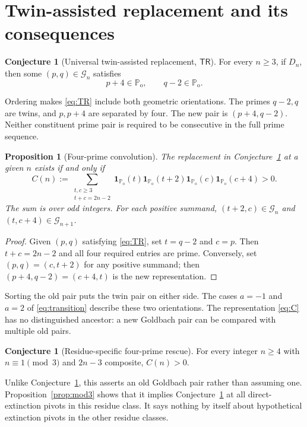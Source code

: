 \documentclass[11pt,a4paper]{article}
\newtheorem{proposition}[theorem]{Proposition}
\theoremstyle{definition}
\newtheorem{conjecture}[theorem]{Conjecture}
\theoremstyle{remark}
\newcommand{\Po}{\mathbb P_{\mathrm{o}}}
\newcommand{\G}{\mathcal G}
\newcommand{\TR}{\mathsf{TR}}
\newcommand{\ind}{\mathbf 1}
\begin{document}
\section{Twin-assisted replacement and its consequences}
\begin{conjecture}[Universal twin-assisted replacement, $\TR$]\label{conj:TR}
For every $n\ge3$, if $D_n$, then some $(p,q)\in\G_n$ satisfies
\begin{equation}\label{eq:TR}
 p+4\in\Po,\qquad q-2\in\Po.
\end{equation}
\end{conjecture}
Ordering makes \eqref{eq:TR} include both geometric orientations. The primes $q-2,q$ are twins, and $p,p+4$ are separated by four. The new pair is $(p+4,q-2)$. Neither constituent prime pair is required to be consecutive in the full prime sequence.

\begin{proposition}[Four-prime convolution]\label{prop:four}
The replacement in Conjecture~\ref{conj:TR} at a given $n$ exists if and only if
\begin{equation}\label{eq:C}
 C(n):=\sum_{\substack{t,c\ge3\\t+c=2n-2}}
 \ind_{\Po}(t)\ind_{\Po}(t+2)\ind_{\Po}(c)\ind_{\Po}(c+4)>0.
\end{equation}
The sum is over odd integers. For each positive summand, $(t+2,c)\in\G_n$
and $(t,c+4)\in\G_{n+1}$.
\end{proposition}
\begin{proof}
Given $(p,q)$ satisfying \eqref{eq:TR}, set $t=q-2$ and $c=p$.
Then $t+c=2n-2$ and all four required entries are prime.
Conversely, set $(p,q)=(c,t+2)$ for any positive summand;
then $(p+4,q-2)=(c+4,t)$ is the new representation.
\end{proof}
Sorting the old pair puts the twin pair on either side. The cases
$a=-1$ and $a=2$ of \eqref{eq:transition} describe these two orientations.
The representation \eqref{eq:C} has no distinguished ancestor:
a new Goldbach pair can be compared with multiple old pairs.

\begin{conjecture}[Residue-specific four-prime rescue]\label{conj:strong}
For every integer $n\ge4$ with $n\equiv1\pmod3$ and $2n-3$ composite,
$C(n)>0$.
\end{conjecture}
Unlike Conjecture~\ref{conj:TR}, this asserts an old Goldbach pair rather
than assuming one. Proposition~\ref{prop:mod3} shows that it implies
Conjecture~\ref{conj:TR} at all direct-extinction pivots in this residue
class. It says nothing by itself about hypothetical extinction pivots
in the other residue classes.
\end{document}
